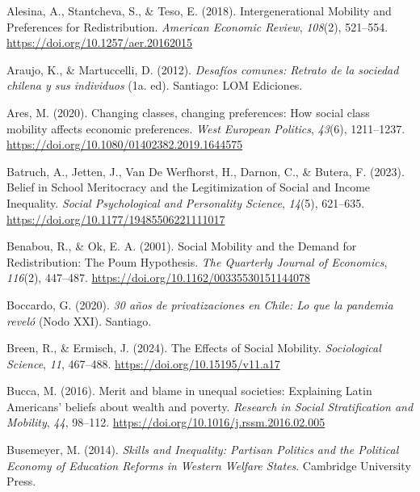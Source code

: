 \documentclass[
  13pt,
]{article}
\newlength{\cslhangindent}
\newenvironment{CSLReferences}[2] %
 {\begin{list}{}{%
  \setlength{\itemindent}{0pt}
  \setlength{\leftmargin}{0pt}
  \setlength{\parsep}{0pt}
  \ifodd #1
   \setlength{\leftmargin}{\cslhangindent}
   \setlength{\itemindent}{-1\cslhangindent}
  \fi
  \setlength{\itemsep}{#2\baselineskip}}}
 {\end{list}}
\begin{document}
\label{refs}
\begin{CSLReferences}{1}{0}
Alesina, A., Stantcheva, S., \& Teso, E. (2018). Intergenerational
{Mobility} and {Preferences} for {Redistribution}. \emph{American
Economic Review}, \emph{108}(2), 521--554.
\url{https://doi.org/10.1257/aer.20162015}

Araujo, K., \& Martuccelli, D. (2012). \emph{Desaf{í}os comunes: Retrato
de la sociedad chilena y sus individuos} (1a. ed). Santiago: LOM
Ediciones.

Ares, M. (2020). Changing classes, changing preferences: How social
class mobility affects economic preferences. \emph{West European
Politics}, \emph{43}(6), 1211--1237.
\url{https://doi.org/10.1080/01402382.2019.1644575}

Batruch, A., Jetten, J., Van De Werfhorst, H., Darnon, C., \& Butera, F.
(2023). Belief in {School Meritocracy} and the {Legitimization} of
{Social} and {Income Inequality}. \emph{Social Psychological and
Personality Science}, \emph{14}(5), 621--635.
\url{https://doi.org/10.1177/19485506221111017}

Benabou, R., \& Ok, E. A. (2001). Social {Mobility} and the {Demand} for
{Redistribution}: {The Poum Hypothesis}. \emph{The Quarterly Journal of
Economics}, \emph{116}(2), 447--487.
\url{https://doi.org/10.1162/00335530151144078}

Boccardo, G. (2020). \emph{30 a{ñ}os de privatizaciones en {Chile}: Lo
que la pandemia revel{ó}} (Nodo XXI). Santiago.

Breen, R., \& Ermisch, J. (2024). The {Effects} of {Social Mobility}.
\emph{Sociological Science}, \emph{11}, 467--488.
\url{https://doi.org/10.15195/v11.a17}

Bucca, M. (2016). Merit and blame in unequal societies: {Explaining
Latin Americans}' beliefs about wealth and poverty. \emph{Research in
Social Stratification and Mobility}, \emph{44}, 98--112.
\url{https://doi.org/10.1016/j.rssm.2016.02.005}

Busemeyer, M. (2014). \emph{Skills and {Inequality}: {Partisan Politics}
and the {Political Economy} of {Education Reforms} in {Western Welfare
States}}. Cambridge University Press.


\end{CSLReferences}
\end{document}
